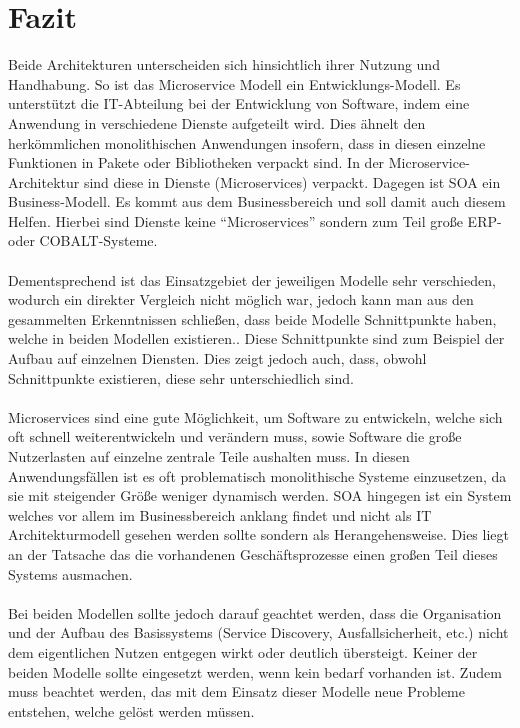 \section{Fazit}
\label{sec:Fazit}
Beide Architekturen unterscheiden sich hinsichtlich ihrer Nutzung und Handhabung. So ist das Microservice Modell ein Entwicklungs-Modell. Es unterstützt die IT-Abteilung bei der Entwicklung von Software, indem eine Anwendung in verschiedene Dienste aufgeteilt wird. Dies ähnelt den herkömmlichen monolithischen Anwendungen insofern, dass in diesen einzelne Funktionen in Pakete oder Bibliotheken verpackt sind. In der Microservice-Architektur sind diese in Dienste (Microservices) verpackt. Dagegen ist SOA ein Business-Modell. Es kommt aus dem Businessbereich und soll damit auch diesem Helfen. Hierbei sind Dienste keine "`Microservices"' sondern zum Teil große ERP- oder COBALT-Systeme.
\\\\
Dementsprechend ist das Einsatzgebiet der jeweiligen Modelle sehr verschieden, wodurch ein direkter Vergleich nicht möglich war, jedoch kann man aus den gesammelten Erkenntnissen schließen, dass beide Modelle  Schnittpunkte haben, welche in beiden Modellen existieren.. Diese Schnittpunkte sind zum Beispiel der Aufbau auf einzelnen Diensten. Dies zeigt jedoch auch, dass, obwohl Schnittpunkte existieren, diese sehr unterschiedlich sind.
\\\\
Microservices sind eine gute Möglichkeit, um Software zu entwickeln, welche sich oft schnell weiterentwickeln und verändern muss, sowie Software die große Nutzerlasten auf einzelne zentrale Teile aushalten muss. In diesen Anwendungsfällen ist es oft problematisch monolithische Systeme einzusetzen, da sie mit steigender Größe weniger dynamisch werden.
SOA hingegen ist ein System welches vor allem im Businessbereich anklang findet und nicht als IT Architekturmodell gesehen werden sollte sondern als Herangehensweise. Dies liegt an der Tatsache das die vorhandenen Geschäftsprozesse einen großen Teil dieses Systems ausmachen.
\\\\
Bei beiden Modellen sollte jedoch darauf geachtet werden, dass die Organisation und der Aufbau des Basissystems (Service Discovery, Ausfallsicherheit, etc.) nicht dem eigentlichen Nutzen entgegen wirkt oder deutlich übersteigt. Keiner der beiden Modelle sollte eingesetzt werden, wenn kein bedarf vorhanden ist. Zudem muss beachtet werden, das mit dem Einsatz dieser Modelle neue Probleme entstehen, welche gelöst werden müssen.
